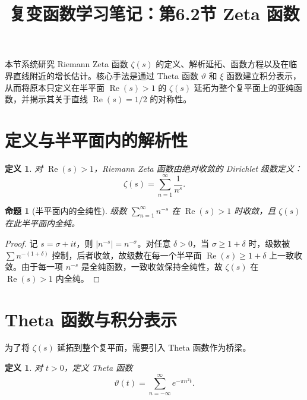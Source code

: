 \documentclass[UTF8]{ctexart}
\title{复变函数学习笔记：第6.2节 Zeta 函数}
\author{}
\date{}
\newtheorem{proposition}[theorem]{命题}
\newtheorem{definition}[theorem]{定义}
\numberwithin{equation}{section}
\begin{document}
\maketitle

本节系统研究 Riemann Zeta 函数 $\zeta(s)$ 的定义、解析延拓、函数方程以及在临界直线附近的增长估计。核心手法是通过 Theta 函数 $\vartheta$ 和 $\xi$ 函数建立积分表示，从而将原本只定义在半平面 $\operatorname{Re}(s)>1$ 的 $\zeta(s)$ 延拓为整个复平面上的亚纯函数，并揭示其关于直线 $\operatorname{Re}(s)=1/2$ 的对称性。

\section{定义与半平面内的解析性}

\begin{definition}
对 $\operatorname{Re}(s)>1$，Riemann Zeta 函数由绝对收敛的 Dirichlet 级数定义：
\begin{equation}\label{eq:ZetaDef}
\zeta(s) = \sum_{n=1}^{\infty} \frac{1}{n^{s}}.
\end{equation}
\end{definition}

\begin{proposition}[半平面内的全纯性]\label{prop:ZetaHalfPlane}
级数 $\sum_{n=1}^{\infty} n^{-s}$ 在 $\operatorname{Re}(s)>1$ 时收敛，且 $\zeta(s)$ 在此半平面内全纯。
\end{proposition}

\begin{proof}
记 $s=\sigma+it$，则 $|n^{-s}| = n^{-\sigma}$。对任意 $\delta>0$，当 $\sigma\ge 1+\delta$ 时，级数被 $\sum n^{-(1+\delta)}$ 控制，后者收敛，故级数在每一个半平面 $\operatorname{Re}(s)\ge 1+\delta$ 上一致收敛。由于每一项 $n^{-s}$ 是全纯函数，一致收敛保持全纯性，故 $\zeta(s)$ 在 $\operatorname{Re}(s)>1$ 内全纯。
\end{proof}

\section{Theta 函数与积分表示}

为了将 $\zeta(s)$ 延拓到整个复平面，需要引入 Theta 函数作为桥梁。

\begin{definition}
对 $t>0$，定义 Theta 函数
\begin{equation}\label{eq:ThetaDef}
\vartheta(t) = \sum_{n=-\infty}^{\infty} e^{-\pi n^{2} t}.
\end{equation}
\end{definition}
\end{document}
